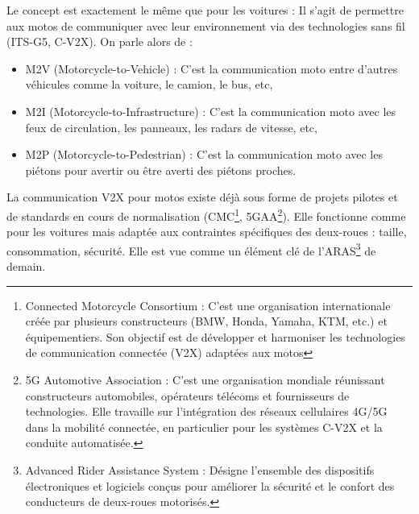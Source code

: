 Le concept est exactement le même que pour les voitures : Il s’agit de permettre aux motos de communiquer avec leur environnement via des technologies sans fil (ITS-G5, C-V2X).
On parle alors de :
\begin{itemize}
    \item M2V (Motorcycle-to-Vehicle) : C'est la communication moto entre d'autres véhicules comme la voiture, le camion, le bus, etc,
    \item M2I (Motorcycle-to-Infrastructure) : C'est la communication moto avec les feux de circulation, les panneaux, les radars de vitesse, etc,
    \item M2P (Motorcycle-to-Pedestrian) : C'est la communication moto avec les piétons pour avertir ou être averti des piétons proches.
\end{itemize}
La communication V2X pour motos existe déjà sous forme de projets pilotes et de standards en cours de normalisation (CMC\footnote{Connected Motorcycle Consortium : C'est une organisation internationale créée par plusieurs constructeurs (BMW, Honda, Yamaha, KTM, etc.) et équipementiers. Son objectif est de développer et harmoniser les technologies de communication connectée (V2X) adaptées aux motos}, 5GAA\footnote{5G Automotive Association : C'est une organisation mondiale réunissant constructeurs automobiles, opérateurs télécoms et fournisseurs de technologies. Elle travaille sur l’intégration des réseaux cellulaires 4G/5G dans la mobilité connectée, en particulier pour les systèmes C-V2X et la conduite automatisée.}). Elle fonctionne comme pour les voitures mais adaptée aux contraintes spécifiques des deux-roues : taille, consommation, sécurité. Elle est vue comme un élément clé de l’ARAS\footnote{Advanced Rider Assistance System : Désigne l’ensemble des dispositifs électroniques et logiciels conçus pour améliorer la sécurité et le confort des conducteurs de deux-roues motorisés.} de demain.
\vspace{0.5cm}

